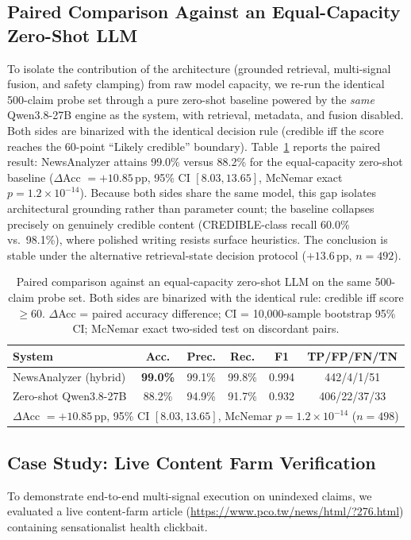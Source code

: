 \documentclass[twoside]{llncs}
\begin{document}
\subsection{Paired Comparison Against an Equal-Capacity Zero-Shot LLM}
To isolate the contribution of the architecture (grounded retrieval, multi-signal fusion, and safety clamping) from raw model capacity, we re-run the identical 500-claim probe set through a pure zero-shot baseline powered by the \emph{same} Qwen3.8-27B engine as the system, with retrieval, metadata, and fusion disabled. Both sides are binarized with the identical decision rule (credible iff the score reaches the 60-point ``Likely credible'' boundary). Table~\ref{tab:fair} reports the paired result: NewsAnalyzer attains 99.0\% versus 88.2\% for the equal-capacity zero-shot baseline ($\Delta$Acc $= +10.85$\,pp, 95\% CI $[8.03, 13.65]$, McNemar exact $p = 1.2\times10^{-14}$). Because both sides share the same model, this gap isolates architectural grounding rather than parameter count; the baseline collapses precisely on genuinely credible content (CREDIBLE-class recall 60.0\% vs.\ 98.1\%), where polished writing resists surface heuristics. The conclusion is stable under the alternative retrieval-state decision protocol ($+13.6$\,pp, $n=492$).

\begin{table}[!htbp]
\caption{Paired comparison against an equal-capacity zero-shot LLM on the same 500-claim probe set. Both sides are binarized with the identical rule: credible iff score $\ge 60$. $\Delta$Acc = paired accuracy difference; CI = 10{,}000-sample bootstrap 95\% CI; McNemar exact two-sided test on discordant pairs.}
\label{tab:fair}
\centering
\begin{tabular}{lccccc}
\toprule
\textbf{System} & \textbf{Acc.} & \textbf{Prec.} & \textbf{Rec.} & \textbf{F1} & \textbf{TP/FP/FN/TN} \\
\midrule
NewsAnalyzer (hybrid) & \textbf{99.0\%} & 99.1\% & 99.8\% & 0.994 & 442/4/1/51 \\
Zero-shot Qwen3.8-27B & 88.2\% & 94.9\% & 91.7\% & 0.932 & 406/22/37/33 \\
\midrule
\multicolumn{6}{l}{$\Delta$Acc $= +10.85$\,pp, 95\% CI $[8.03, 13.65]$, McNemar $p = 1.2\times10^{-14}$ ($n=498$)} \\
\bottomrule
\end{tabular}
\end{table}

\subsection{Case Study: Live Content Farm Verification}
To demonstrate end-to-end multi-signal execution on unindexed claims, we evaluated a live content-farm article (\url{https://www.pco.tw/news/html/?276.html}) containing sensationalist health clickbait. 
\end{document}
